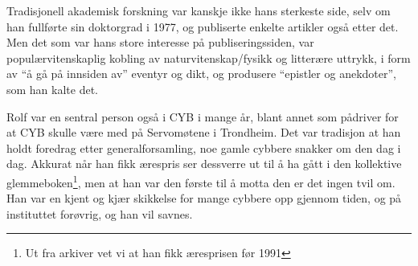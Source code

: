 Tradisjonell akademisk forskning var kanskje ikke hans sterkeste side, selv om han fullførte sin doktorgrad i 1977, og publiserte enkelte artikler også etter det. Men det som var hans store interesse på publiseringssiden, var populærvitenskaplig kobling av naturvitenskap\slash fysikk og litterære uttrykk, i form av ``å gå på innsiden av'' eventyr og dikt, og produsere ``epistler og anekdoter'', som han kalte det.

Rolf var en sentral person også i CYB i mange år, blant annet som pådriver for at CYB skulle være med på Servomøtene i Trondheim. Det var tradisjon at han holdt foredrag etter generalforsamling, noe gamle cybbere snakker om den dag i dag. Akkurat når han fikk ærespris ser dessverre ut til å ha gått i den kollektive glemmeboken\footnote{Ut fra arkiver vet vi at han fikk æresprisen før 1991}, men at han var den første til å motta den er det ingen tvil om. Han var en kjent og kjær skikkelse for mange cybbere opp gjennom tiden, og på instituttet forøvrig, og han vil savnes.
